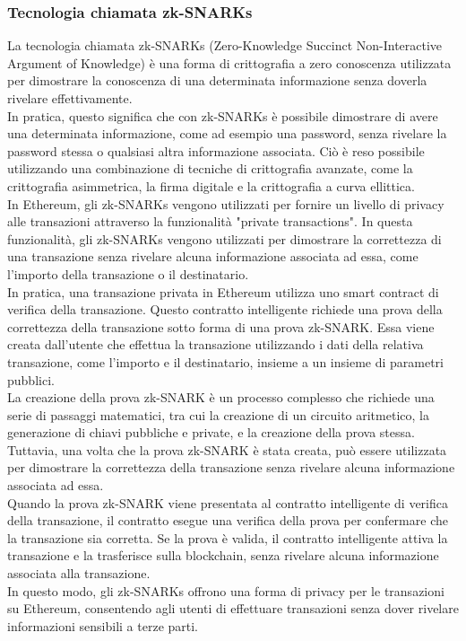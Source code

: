\documentclass[a4paper,11pt]{report}
\begin{document}
\subsubsection{Tecnologia chiamata zk-SNARKs}
La tecnologia chiamata zk-SNARKs (Zero-Knowledge Succinct Non-Interactive Argument of Knowledge) è una forma di crittografia a zero conoscenza utilizzata per dimostrare la conoscenza di una determinata informazione senza doverla rivelare effettivamente.\\ In pratica, questo significa che con zk-SNARKs è possibile dimostrare di avere una determinata informazione, come ad esempio una password, senza rivelare la password stessa o qualsiasi altra informazione associata. Ciò è reso possibile utilizzando una combinazione di tecniche di crittografia avanzate, come la crittografia asimmetrica, la firma digitale e la crittografia a curva ellittica.\\
In Ethereum, gli zk-SNARKs vengono utilizzati per fornire un livello di privacy alle transazioni attraverso la funzionalità "private transactions". In questa funzionalità, gli zk-SNARKs vengono utilizzati per dimostrare la correttezza di una transazione senza rivelare alcuna informazione associata ad essa, come l'importo della transazione o il destinatario.\\ In pratica, una transazione privata in Ethereum utilizza uno smart contract di verifica della transazione. Questo contratto intelligente richiede una prova della correttezza della transazione sotto forma di una prova zk-SNARK. Essa viene creata dall'utente che effettua la transazione utilizzando i dati della relativa transazione, come l'importo e il destinatario, insieme a un insieme di parametri pubblici.\\ La creazione della prova zk-SNARK è un processo complesso che richiede una serie di passaggi matematici, tra cui la creazione di un circuito aritmetico, la generazione di chiavi pubbliche e private, e la creazione della prova stessa. Tuttavia, una volta che la prova zk-SNARK è stata creata, può essere utilizzata per dimostrare la correttezza della transazione senza rivelare alcuna informazione associata ad essa.\\
Quando la prova zk-SNARK viene presentata al contratto intelligente di verifica della transazione, il contratto esegue una verifica della prova per confermare che la transazione sia corretta. Se la prova è valida, il contratto intelligente attiva la transazione e la trasferisce sulla blockchain, senza rivelare alcuna informazione associata alla transazione.\\
In questo modo, gli zk-SNARKs offrono una forma di privacy per le transazioni su Ethereum, consentendo agli utenti di effettuare transazioni senza dover rivelare informazioni sensibili a terze parti.
\end{document}
